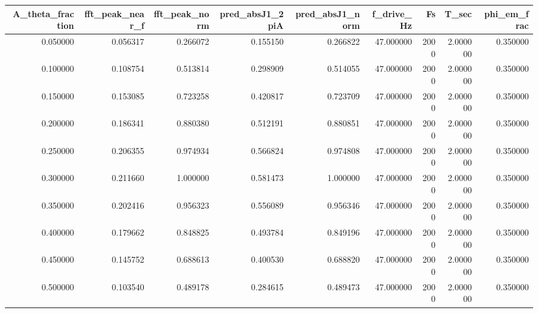 \begin{tabular}{rrrrrrrrr}
\toprule
A_theta_fraction & fft_peak_near_f & fft_peak_norm & pred_absJ1_2piA & pred_absJ1_norm & f_drive_Hz & Fs & T_sec & phi_em_frac \\
\midrule
0.050000 & 0.056317 & 0.266072 & 0.155150 & 0.266822 & 47.000000 & 2000 & 2.000000 & 0.350000 \\
0.100000 & 0.108754 & 0.513814 & 0.298909 & 0.514055 & 47.000000 & 2000 & 2.000000 & 0.350000 \\
0.150000 & 0.153085 & 0.723258 & 0.420817 & 0.723709 & 47.000000 & 2000 & 2.000000 & 0.350000 \\
0.200000 & 0.186341 & 0.880380 & 0.512191 & 0.880851 & 47.000000 & 2000 & 2.000000 & 0.350000 \\
0.250000 & 0.206355 & 0.974934 & 0.566824 & 0.974808 & 47.000000 & 2000 & 2.000000 & 0.350000 \\
0.300000 & 0.211660 & 1.000000 & 0.581473 & 1.000000 & 47.000000 & 2000 & 2.000000 & 0.350000 \\
0.350000 & 0.202416 & 0.956323 & 0.556089 & 0.956346 & 47.000000 & 2000 & 2.000000 & 0.350000 \\
0.400000 & 0.179662 & 0.848825 & 0.493784 & 0.849196 & 47.000000 & 2000 & 2.000000 & 0.350000 \\
0.450000 & 0.145752 & 0.688613 & 0.400530 & 0.688820 & 47.000000 & 2000 & 2.000000 & 0.350000 \\
0.500000 & 0.103540 & 0.489178 & 0.284615 & 0.489473 & 47.000000 & 2000 & 2.000000 & 0.350000 \\
\bottomrule
\end{tabular}
